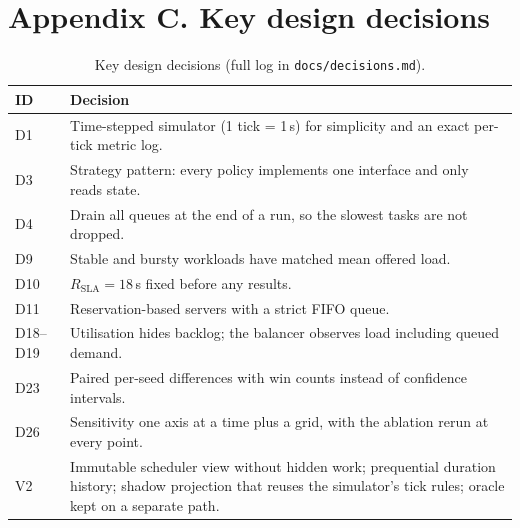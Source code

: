 \documentclass[11pt,a4paper]{article}
\newcommand{\code}[1]{\texttt{#1}}
\begin{document}
\section*{Appendix C. Key design decisions}
\begin{table}[H]
\caption{Key design decisions (full log in \code{docs/decisions.md}).}\label{tab:decisions}
\small
\begin{tabularx}{\linewidth}{lY}
\toprule
\textbf{ID} & \textbf{Decision}\\
\midrule
D1 & Time-stepped simulator (1 tick = 1\,s) for simplicity and an exact per-tick metric log.\\
D3 & Strategy pattern: every policy implements one interface and only reads state.\\
D4 & Drain all queues at the end of a run, so the slowest tasks are not dropped.\\
D9 & Stable and bursty workloads have matched mean offered load.\\
D10 & $R_{\mathrm{SLA}} = 18$\,s fixed before any results.\\
D11 & Reservation-based servers with a strict FIFO queue.\\
D18--D19 & Utilisation hides backlog; the balancer observes load including queued demand.\\
D23 & Paired per-seed differences with win counts instead of confidence intervals.\\
D26 & Sensitivity one axis at a time plus a grid, with the ablation rerun at every point.\\
V2 & Immutable scheduler view without hidden work; prequential duration history; shadow projection that
reuses the simulator's tick rules; oracle kept on a separate path.\\
\bottomrule
\end{tabularx}
\end{table}
\end{document}
